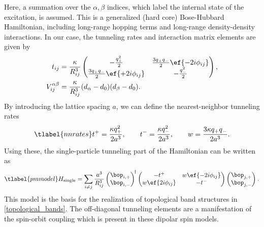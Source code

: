 Here, a summation over the $\alpha, \beta$ indices, which label the internal state of the excitation, is assumed. This is a generalized (hard core) Bose-Hubbard Hamiltonian, including long-range hopping terms and long-range density-density interactions. In our case, the tunneling rates and interaction matrix elements are given by
\begin{align}
    t_{ij} &= \frac{\kappa}{R_{ij}^3} \begin{pmatrix}
    -\frac{q_+^2}{2} & \frac{3q_+q_-}{2} \ef{-2i \phi_{ij}} \\
    \frac{3q_+q_-}{2} \ef{+2i \phi_{ij}} & -\frac{q_-^2}{2}
\end{pmatrix}, \\
    V_{ij}^{\alpha\beta} &= \frac{\kappa}{R_{ij}^3} (d_\alpha-d_0)(d_\beta-d_0).
\end{align}
By introducing the lattice spacing $a$, we can define the nearest-neighbor tunneling rates
\begin{align} \tlabel{nnrates}
    t^+ = \frac{\kappa q_{+}^2}{2a^3},\qquad
    t^- = \frac{\kappa q_{-}^2}{2a^3},\qquad
    w = \frac{3 \kappa q_{+}q_{-}}{2a^3}.
\end{align}
Using these, the single-particle tunneling part of the Hamiltonian can be written as
\begin{align} \tlabel{pmmodel}
    H_\text{single} = \sum_{i\ne j} \frac{a^3}{R_{ij}^3}
    \begin{pmatrix}
        \bop_{i,+} \\
        \bop_{i,-}
    \end{pmatrix}^{\!\dag}
    \begin{pmatrix}
        -t^+ & w \ef{-2i \phi_{ij}} \\
        w \ef{2i \phi_{ij}} & -t^- \\
    \end{pmatrix}
    \begin{pmatrix}
        \bop_{j,+} \\
        \bop_{j,-}
    \end{pmatrix}^{\vphantom\dag}.
\end{align}
This model is the basis for the realization of topological band structures in \cref{topological_bands}. The off-diagonal tunneling elements are a manifestation of the spin-orbit coupling which is present in these dipolar spin models.



